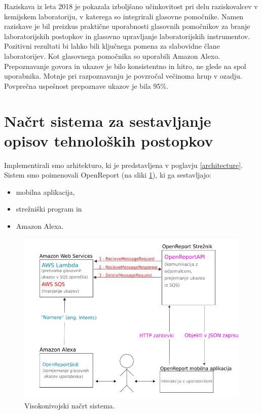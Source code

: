 \documentclass[a4paper, 12pt]{book}
\begin{document}
Raziskava iz leta 2018 \cite{austerjost2018introducing} je pokazala izboljšano učinkovitost pri delu raziskovalcev v kemijskem laboratoriju, v katerega so integrirali glasovne pomočnike.
Namen raziskave je bil preizkus praktične uporabnosti glasovnih pomočnikov za branje laboratorijskih postopkov in glasovno upravljanje laboratorijskih instrumentov.
Pozitivni rezultati bi lahko bili ključnega pomena za slabovidne člane laboratorijev.
Kot glasovnega pomočnika so uporabili Amazon Alexo.
Prepoznavanje govora in ukazov je bilo konsistentno in hitro, ne glede na spol uporabnika.
Motnje pri razpoznavanju je povzročal večinoma hrup v ozadju.
Povprečna uspešnost prepoznave ukazov je bila 95\%.




\section{Načrt sistema za sestavljanje opisov tehnoloških postopkov}

Implementirali smo arhitekturo, ki je predstavljena v poglavju \ref{architecture}.
Sistem smo poimenovali OpenReport (na sliki \ref{plan}), ki ga sestavljajo:
\begin{itemize}
	\item mobilna aplikacija,
	\item strežniški program in 
	\item Amazon Alexa.
\end{itemize}

\begin{figure}[H]
\begin{center}
\includegraphics[width=13cm]{plan}
\end{center}
\caption{Visokonivojski načrt sistema.}
\label{plan}
\end{figure}
\end{document}
